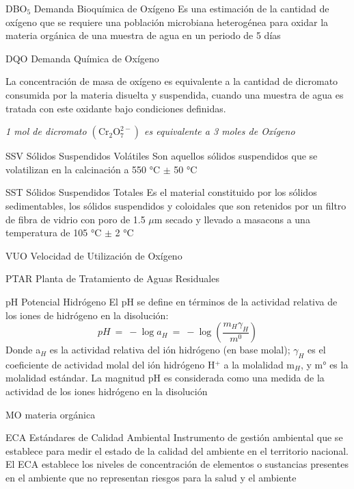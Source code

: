 {DBO$_{5}$}            %
{Demanda Bioquímica de Oxígeno}  %
{Es una estimación de la cantidad de oxígeno que se requiere una población microbiana heterogénea para oxidar la materia orgánica de una muestra de agua en un periodo de 5 días} %

{DQO}
{Demanda Química de Oxígeno}
{La concentración de masa de oxígeno es equivalente a la cantidad de dicromato consumida por la materia disuelta y suspendida, cuando una muestra de agua es tratada con este oxidante bajo condiciones definidas.
\begin{center}
	\emph{1 mol de dicromato $\mathrm{(Cr_{2}O_{7}^{2-})}$ es equivalente a 3 moles de Oxígeno}
\end{center}
}

{SSV}
{Sólidos Suspendidos Volátiles}
{Son aquellos sólidos suspendidos que se volatilizan en la calcinación a 550 °C $\pm$ 50 °C}

{SST}
{Sólidos Suspendidos Totales}
{Es el material constituido por los sólidos sedimentables, los sólidos suspendidos y coloidales que son retenidos por un filtro de fibra de vidrio con poro de 1.5 $\mu$m secado y llevado a \gls{masacons} a una temperatura de 105 °C $\pm$ 2 °C}

{VUO}
{Velocidad de Utilización de Oxígeno}
{}

{PTAR}
{Planta de Tratamiento de Aguas Residuales}
{}

{pH}
{Potencial Hidrógeno}
{El pH se define en términos de la actividad relativa de los iones de hidrógeno en la disolución:
$$pH\ =\ -\log a_{H}\ =\ -\log (\frac{m_{H}\gamma_{H}}{m^{0}})$$
Donde a$_{H}$ es la actividad relativa del ión hidrógeno (en base molal); $\gamma_{H}$ es el coeficiente de actividad molal del ión hidrógeno H$^{+}$ a la molalidad m$_{H}$, y m° es la molalidad estándar. La magnitud pH es considerada como una medida de la actividad de los iones hidrógeno en la disolución}

{MO}
{materia orgánica}
{}

{ECA}
{Estándares de Calidad Ambiental}
{Instrumento de gestión ambiental que se establece para medir el estado de la calidad del ambiente en el territorio nacional. El ECA establece los niveles de concentración de elementos o sustancias presentes en el ambiente que no representan riesgos para la salud y el ambiente}

